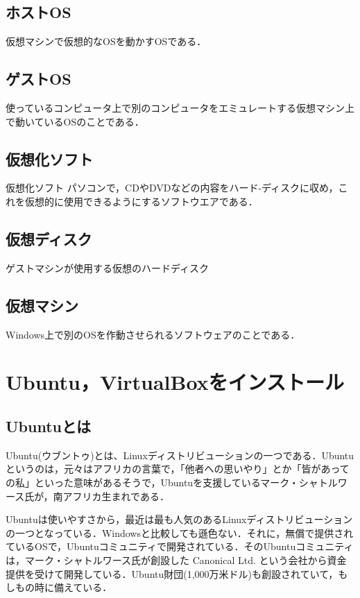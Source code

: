 \subsection{ホストOS}
仮想マシンで仮想的なOSを動かすOSである．

\subsection{ゲストOS}
使っているコンピュータ上で別のコンピュータをエミュレートする仮想マシン上で動いているOSのことである．

\subsection{仮想化ソフト}仮想化ソフト
パソコンで，CDやDVDなどの内容をハード-ディスクに収め，これを仮想的に使用できるようにするソフトウエアである．



\subsection{仮想ディスク}
ゲストマシンが使用する仮想のハードディスク


\subsection{仮想マシン}

Windows上で別のOSを作動させられるソフトウェアのことである．

\section{Ubuntu，VirtualBoxをインストール}

\subsection{Ubuntuとは}
Ubuntu(ウブントゥ)とは、Linuxディストリビューションの一つである．Ubuntuというのは，元々はアフリカの言葉で，「他者への思いやり」とか「皆があっての私」といった意味があるそうで，Ubuntuを支援しているマーク・シャトルワース氏が，南アフリカ生まれである．

Ubuntuは使いやすさから，最近は最も人気のあるLinuxディストリビューションの一つとなっている．Windowsと比較しても遜色ない．それに，無償で提供されているOSで，Ubuntuコミュニティで開発されている．そのUbuntuコミュニティは，マーク・シャトルワース氏が創設した Canonical Ltd. という会社から資金提供を受けて開発している．Ubuntu財団(1,000万米ドル)も創設されていて，もしもの時に備えている．

